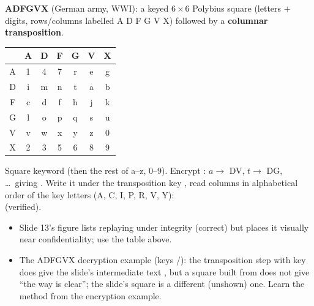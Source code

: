 \textbf{ADFGVX} (German army, WWI): a keyed $6 \times 6$ Polybius square (letters $+$ digits, rows/columns labelled A D F G V X) followed by a \textbf{columnar transposition}.
\begin{center}\small
\begin{tabular}{@{}c|cccccc@{}}
 & A&D&F&G&V&X\\ \midrule
A&1&4&7&r&e&g\\
D&i&m&n&t&a&b\\
F&c&d&f&h&j&k\\
G&l&o&p&q&s&u\\
V&v&w&x&y&z&0\\
X&2&3&5&6&8&9\\
\end{tabular}
\quad
\begin{minipage}{0.55\textwidth}
Square keyword  (then the rest of a--z, 0--9). Encrypt : $a \to$ DV, $t \to$ DG, \dots\ giving . Write it under the transposition key , read columns in alphabetical order of the key letters (A, C, I, P, R, V, Y):\\
 (verified).
\end{minipage}
\end{center}

\begin{fixbox}
\begin{itemize}
  \item Slide 13's figure lists replaying under integrity (correct) but places it visually near confidentiality; use the table above.
  \item The ADFGVX decryption example (keys /): the transposition step with key  does give the slide's intermediate text , but a square built from  does not give ``the way is clear''; the slide's square is a different (unshown) one. Learn the method from the encryption example.
\end{itemize}
\end{fixbox}

